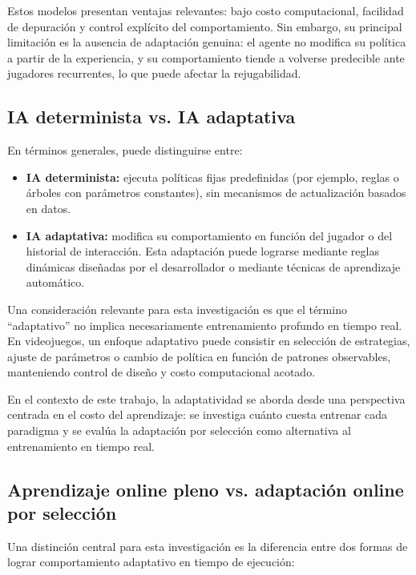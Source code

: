 Estos modelos presentan ventajas relevantes: bajo costo computacional, facilidad de depuración y control explícito del comportamiento. Sin embargo, su principal limitación es la ausencia de adaptación genuina: el agente no modifica su política a partir de la experiencia, y su comportamiento tiende a volverse predecible ante jugadores recurrentes, lo que puede afectar la rejugabilidad.

\subsection{IA determinista vs. IA adaptativa}

En términos generales, puede distinguirse entre:

\begin{itemize}
    \item \textbf{IA determinista:} ejecuta políticas fijas predefinidas (por ejemplo, reglas o árboles con parámetros constantes), sin mecanismos de actualización basados en datos.
    \item \textbf{IA adaptativa:} modifica su comportamiento en función del jugador o del historial de interacción. Esta adaptación puede lograrse mediante reglas dinámicas diseñadas por el desarrollador o mediante técnicas de aprendizaje automático.
\end{itemize}

Una consideración relevante para esta investigación es que el término ``adaptativo'' no implica necesariamente entrenamiento profundo en tiempo real. En videojuegos, un enfoque adaptativo puede consistir en selección de estrategias, ajuste de parámetros o cambio de política en función de patrones observables, manteniendo control de diseño y costo computacional acotado.

En el contexto de este trabajo, la adaptatividad se aborda desde una perspectiva centrada en el costo del aprendizaje: se investiga cuánto cuesta entrenar cada paradigma y se evalúa la adaptación por selección como alternativa al entrenamiento en tiempo real.

\subsection{Aprendizaje online pleno vs. adaptación online por selección}

Una distinción central para esta investigación es la diferencia entre dos formas de lograr comportamiento adaptativo en tiempo de ejecución:

